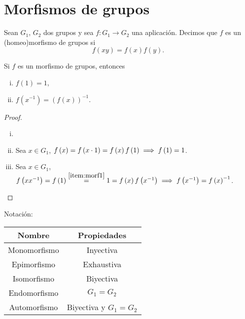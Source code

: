 \section{Morfismos de grupos}

\begin{defi}
    Sean $G_1$, $G_2$ dos grupos y sea $f \colon G_1 \to G_2$ una aplicación. Decimos que $f$ es un
    (homeo)morfismo de grupos si
    \[
        f(xy) = f(x)f(y).
    \]
\end{defi}

\begin{prop}
    Si $f$ es un morfismo de grupos, entonces
    \begin{enumerate}[i)]
        \item \label{item:morf1} $f(1) = 1$,
        \item $f\left( x^{-1} \right) = \left( f(x) \right)^{-1}$.
    \end{enumerate}
\end{prop}

\begin{proof}
    \begin{enumerate}[i)]
        \item[]
        \item Sea $x \in G_1$, $f \left( x \right) = f\left( x\cdot 1\right) = f\left(x \right)f\left( 1 \right) \implies f\left( 1 \right) = 1$.
        \item Sea $x \in G_1$, $f \left( xx^{-1} \right) = f\left( 1\right) \stackrel{\ref{item:morf1}}{=} 1 = f\left(x \right)f\left( x^{-1} \right) \implies f\left( x^{-1} \right) = f\left( x \right)^{-1}$.
    \end{enumerate}
\end{proof}

\begin{obs}
    Notación:
    \begin{center}
        \begin{tabular}{|c|c|}
            \hline
            Nombre & Propiedades \\
            \hline\hline
            Monomorfismo & Inyectiva \\\hline
            Epimorfismo  & Exhaustiva \\\hline
            Isomorfismo  & Biyectiva \\\hline
            Endomorfismo & $G_1 = G_2$ \\\hline
            Automorfismo & Biyectiva y $G_1 = G_2$ \\
            \hline
        \end{tabular}
    \end{center}
\end{obs}

